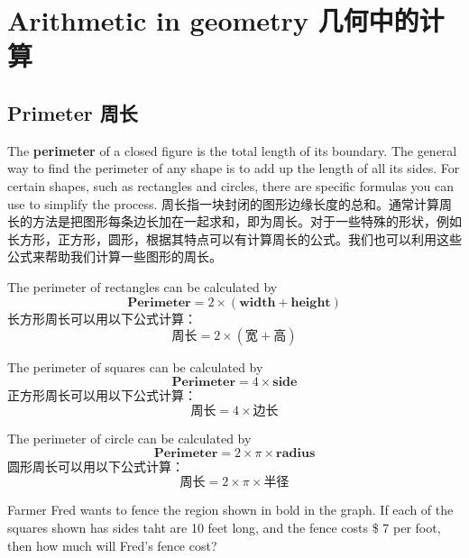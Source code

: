 \section{Arithmetic in geometry 几何中的计算}

\subsection{Primeter 周长}
\begin{paracol}{2}
The {\bf perimeter} of a closed figure is the total length of its boundary. The general way to find the perimeter of any shape is to add up the length of all its sides. For certain shapes, such as rectangles and circles, there are specific formulas you can use to simplify the process. 
\switchcolumn[1]
周长指一块封闭的图形边缘长度的总和。通常计算周长的方法是把图形每条边长加在一起求和，即为周长。对于一些特殊的形状，例如长方形，正方形，圆形，根据其特点可以有计算周长的公式。我们也可以利用这些公式来帮助我们计算一些图形的周长。
\end{paracol}
\begin{newprop}
The perimeter of rectangles can be calculated by 
$$
\textbf{Perimeter} = 2\times(\textbf{width}+\textbf{height})
$$
长方形周长可以用以下公式计算：
$$
\textbf{周长} = 2\times(\textbf{宽}+\textbf{高})
$$
\end{newprop}
\begin{newprop}
The perimeter of squares can be calculated by 
$$
\textbf{Perimeter} = 4\times\textbf{side}
$$
正方形周长可以用以下公式计算：
$$
\textbf{周长} = 4\times\textbf{边长}
$$
\end{newprop}
\begin{newprop}
The perimeter of circle can be calculated by 
$$
\textbf{Perimeter} = 2\times\pi\times\textbf{radius}
$$
圆形周长可以用以下公式计算：
$$
\textbf{周长} = 2\times\pi\times\textbf{半径}
$$
\end{newprop}
\begin{example}
Farmer Fred
 wants to fence the region shown in bold in the graph. If each of the squares shown has sides taht are 10 feet long, and the fence costs \$ 7 per foot, then how much will Fred's fence cost?
 \begin{center}
\end{center}
\end{example}
